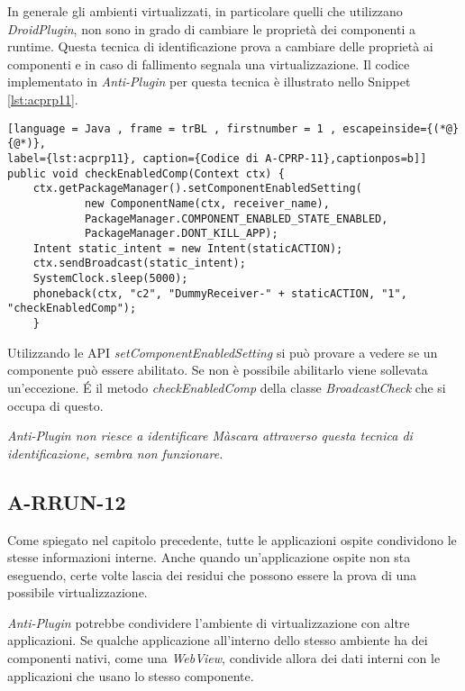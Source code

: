 In generale gli ambienti virtualizzati, in particolare quelli che utilizzano \emph{DroidPlugin}, non sono in grado di cambiare le proprietà dei componenti a runtime. Questa tecnica di identificazione prova a cambiare delle proprietà ai componenti e in caso di fallimento segnala una virtualizzazione.
Il codice implementato in \emph{Anti-Plugin} per questa tecnica è illustrato nello Snippet \ref{lst:acprp11}.

\begin{lstlisting}[language = Java , frame = trBL , firstnumber = 1 , escapeinside={(*@}{@*)},
label={lst:acprp11}, caption={Codice di A-CPRP-11},captionpos=b]]
public void checkEnabledComp(Context ctx) { 
    ctx.getPackageManager().setComponentEnabledSetting(
            new ComponentName(ctx, receiver_name),
            PackageManager.COMPONENT_ENABLED_STATE_ENABLED,
            PackageManager.DONT_KILL_APP);
    Intent static_intent = new Intent(staticACTION);
    ctx.sendBroadcast(static_intent);
    SystemClock.sleep(5000);
    phoneback(ctx, "c2", "DummyReceiver-" + staticACTION, "1", "checkEnabledComp");
    }
\end{lstlisting}

 Utilizzando le API \emph{setComponentEnabledSetting} si può provare a vedere se un componente può essere abilitato. Se non è possibile abilitarlo viene sollevata un'eccezione. É il metodo \emph{checkEnabledComp} della classe \emph{BroadcastCheck} che si occupa di questo. 
 
\emph{Anti-Plugin non riesce a identificare Màscara attraverso questa tecnica di identificazione, sembra non funzionare.}



\subsection*{A-RRUN-12}
\label{a-rrun-12}

Come spiegato nel capitolo precedente, tutte le applicazioni ospite condividono le stesse informazioni interne. Anche quando un'applicazione ospite non sta eseguendo, certe volte lascia dei residui che possono essere la prova di una possibile virtualizzazione.


\emph{Anti-Plugin} potrebbe condividere l'ambiente di virtualizzazione con altre applicazioni. Se qualche applicazione all'interno dello stesso ambiente ha dei componenti nativi, come una \emph{WebView}, condivide allora dei dati interni con le applicazioni che usano lo stesso componente.

